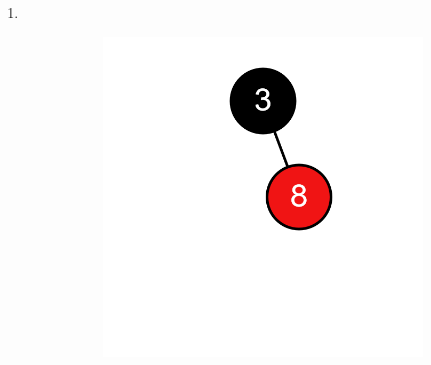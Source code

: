 \documentclass[11pt,a4paper]{article}
\begin{document}
\begin{loesung}
\begin{enumerate}[label=\alph*)]
\begin{enumerate}[label=\roman*)]
\begin{figure}[h!]
\begin{subfigure}[t]{0.15\textwidth}
                \end{subfigure}
            \end{figure}
            \item \ \\
            \begin{figure}[h!]
                \centering
                \begin{subfigure}[t]{0.15\textwidth}
                    \centering
                    \includegraphics[width=\textwidth]{img/2b/8}
                \end{subfigure}
                \begin{subfigure}[t]{0.15\textwidth}
                    \centering

\end{subfigure}
\end{figure}
\end{enumerate}
\end{enumerate}
\end{loesung}
\end{document}
